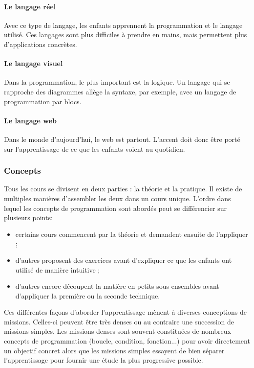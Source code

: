 \paragraph{Le langage réel} Avec ce type de langage, les enfants apprennent la programmation et le langage utilisé. Ces langages sont plus difficiles à prendre en mains, mais permettent plus d'applications concrètes.
\paragraph{Le langage visuel} Dans la programmation, le plus important est la logique. Un langage qui se rapproche des diagrammes allège la syntaxe, par exemple, avec un langage de programmation par \glspl{bloc}.
\paragraph{Le langage web} Dans le monde d'aujourd'hui, le web est partout. L'accent doit donc être porté sur l'apprentissage de ce que les enfants voient au quotidien.


\subsubsection{Concepts}
Tous les cours se divisent en deux parties : la théorie et la pratique. Il existe de multiples manières d'assembler les deux dans un cours unique. L'ordre dans lequel les concepts de programmation sont abordés peut se différencier sur plusieurs points:
\begin{itemize}
  \item certains cours commencent par la théorie et demandent ensuite de l'appliquer ;
  \item d'autres proposent des exercices avant d'expliquer ce que les enfants ont utilisé de manière intuitive ;
  \item d'autres encore découpent la matière en petits sous-ensembles avant d'appliquer la première ou la seconde technique.\\
\end{itemize}


Ces différentes façons d'aborder l'apprentissage mènent à diverses conceptions de \glspl{mission}. Celles-ci peuvent être très denses ou au contraire une succession de \glspl{mission} simples. Les \glspl{mission} denses sont souvent constituées de nombreux concepts de programmation (boucle, condition, fonction...) pour avoir directement un objectif concret alors que les \glspl{mission} simples essayent de bien séparer l'apprentissage pour fournir une étude la plus progressive possible.\\

